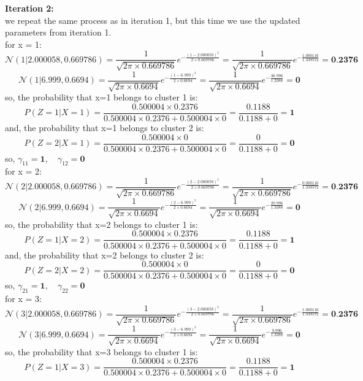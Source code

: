 \documentclass{article}
\begin{document}
\begin{enumerate}
\textbf{Iteration 2:}
\\ we repeat the same process as in iteration 1, but this time we use the updated parameters from iteration 1.
\\ for x = 1:
\[
\mathcal{N}(1 | 2.000058, 0.669786) = \frac{1}{\sqrt{2\pi \times 0.669786}} e^{-\frac{(1-2.000058)^2}{2 \times 0.669786}} = \frac{1}{\sqrt{2\pi \times 0.669786}} e^{-\frac{1.000116}{1.339572}} = \textbf{0.2376}
\]
\[
\mathcal{N}(1 | 6.999, 0.6694) = \frac{1}{\sqrt{2\pi \times 0.6694}} e^{-\frac{(1-6.999)^2}{2 \times 0.6694}} = \frac{1}{\sqrt{2\pi \times 0.6694}} e^{-\frac{36.996}{1.3388}} = \textbf{0}
\]
so, the probability that x=1 belongs to cluster 1 is:
\[
P(Z = 1 | X = 1) = \frac{0.500004 \times 0.2376}{0.500004 \times 0.2376 + 0.500004 \times 0} = \frac{0.1188}{0.1188 + 0} = \textbf{1}
\]
and, the probability that x=1 belongs to cluster 2 is:
\[
P(Z = 2 | X = 1) = \frac{0.500004 \times 0}{0.500004 \times 0.2376 + 0.500004 \times 0} = \frac{0}{0.1188 + 0} = \textbf{0}
\]
so, $\gamma_{11} = \textbf{1}, \quad \gamma_{12} = \textbf{0}$
\\ for x = 2:
\[
\mathcal{N}(2 | 2.000058, 0.669786) = \frac{1}{\sqrt{2\pi \times 0.669786}} e^{-\frac{(2-2.000058)^2}{2 \times 0.669786}} = \frac{1}{\sqrt{2\pi \times 0.669786}} e^{-\frac{0.000116}{1.339572}} = \textbf{0.2376}
\]
\[
\mathcal{N}(2 | 6.999, 0.6694) = \frac{1}{\sqrt{2\pi \times 0.6694}} e^{-\frac{(2-6.999)^2}{2 \times 0.6694}} = \frac{1}{\sqrt{2\pi \times 0.6694}} e^{-\frac{20.996}{1.3388}} = \textbf{0}
\]
so, the probability that x=2 belongs to cluster 1 is:
\[
P(Z = 1 | X = 2) = \frac{0.500004 \times 0.2376}{0.500004 \times 0.2376 + 0.500004 \times 0} = \frac{0.1188}{0.1188 + 0} = \textbf{1}
\]
and, the probability that x=2 belongs to cluster 2 is:
\[
P(Z = 2 | X = 2) = \frac{0.500004 \times 0}{0.500004 \times 0.2376 + 0.500004 \times 0} = \frac{0}{0.1188 + 0} = \textbf{0}
\]
so, $\gamma_{21} = \textbf{1}, \quad \gamma_{22} = \textbf{0}$
\\ for x = 3:
\[
\mathcal{N}(3 | 2.000058, 0.669786) = \frac{1}{\sqrt{2\pi \times 0.669786}} e^{-\frac{(3-2.000058)^2}{2 \times 0.669786}} = \frac{1}{\sqrt{2\pi \times 0.669786}} e^{-\frac{1.000116}{1.339572}} = \textbf{0.2376}
\]
\[
\mathcal{N}(3 | 6.999, 0.6694) = \frac{1}{\sqrt{2\pi \times 0.6694}} e^{-\frac{(3-6.999)^2}{2 \times 0.6694}} = \frac{1}{\sqrt{2\pi \times 0.6694}} e^{-\frac{9.996}{1.3388}} = \textbf{0}
\]
so, the probability that x=3 belongs to cluster 1 is:
\[
P(Z = 1 | X = 3) = \frac{0.500004 \times 0.2376}{0.500004 \times 0.2376 + 0.500004 \times 0} = \frac{0.1188}{0.1188 + 0} = \textbf{1}
\]
\end{enumerate}
\end{document}
